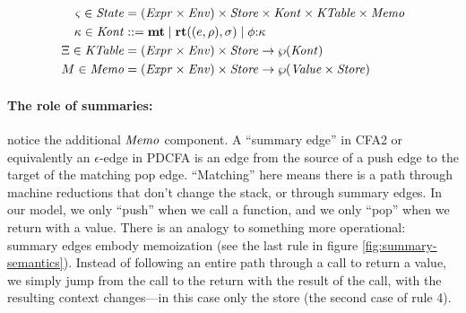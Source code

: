 \begin{align*}
  \varsigma \in \mathit{State} &= (\mathit{Expr} \times \mathit{Env}) \times \mathit{Store} \times \mathit{Kont} \times \mathit{KTable} \times \mathit{Memo} \\
  \kappa \in \mathit{Kont} &::= \mathbf{mt} \mid \mathbf{rt}((e,\rho),\sigma) \mid \phi{\tt :} \kappa \\
  \Xi \in \mathit{KTable} &= (\mathit{Expr} \times \mathit{Env})\times \mathit{Store} \to \wp(\mathit{Kont}) \\
  M \in \mathit{Memo} &= (\mathit{Expr} \times \mathit{Env})\times \mathit{Store} \to \wp(\mathit{Value} \times \mathit{Store})
\end{align*}

\paragraph{The role of summaries:} notice the additional $\mathit{Memo}$ component.
%
A ``summary edge'' in CFA2 or equivalently an $\epsilon$-edge in PDCFA is an edge from the source of a push edge to the target of the matching pop edge.
%
``Matching'' here means there is a path through machine reductions that don't change the stack, or through summary edges.
%
In our model, we only ``push'' when we call a function, and we only ``pop'' when we return with a value.
%
There is an analogy to something more operational: summary edges embody memoization (see the last rule in figure \ref{fig:summary-semantics}).
%
Instead of following an entire path through a call to return a value, we simply jump from the call to the return with the result of the call, with the resulting context changes---in this case only the store (the second case of rule 4).

